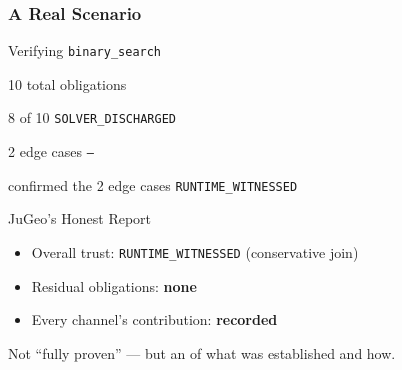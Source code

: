 \begin{frame}
\frametitle{A Real Scenario}
\begin{exampleblock}{Verifying \texttt{binary\_search}}
\small
\begin{description}
  \item[\textbf{Cover points:}] 10 total obligations
  \item[\textbf{Z3 proved:}] 8 of 10 \hfill\textcolor{jugeoGreen}{\texttt{SOLVER\_DISCHARGED}}
  \item[\textbf{Z3 timed out:}] 2 edge cases \hfill\textcolor{jugeoOrange}{\texttt{---}}
  \item[\textbf{Runtime tests:}] confirmed the 2 edge cases \hfill\textcolor{jugeoBlue}{\texttt{RUNTIME\_WITNESSED}}
\end{description}
\end{exampleblock}
\vspace{0.3cm}
\begin{block}{JuGeo's Honest Report}
\begin{itemize}
  \item Overall trust: \texttt{RUNTIME\_WITNESSED} \hfill (conservative join)
  \item Residual obligations: \textbf{none}
  \item Every channel's contribution: \textbf{recorded}
\end{itemize}
\end{block}
\vfill
\begin{center}
\small Not ``fully proven'' --- but an  of what was established and how.
\end{center}
\end{frame}

